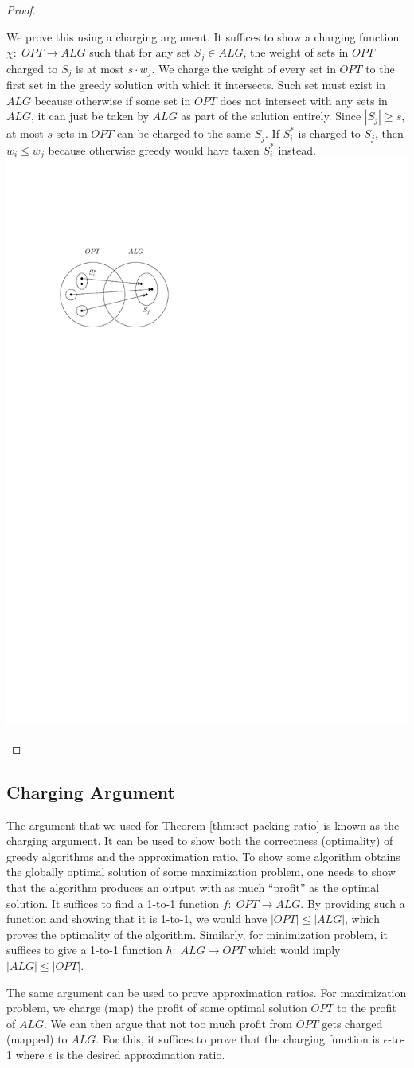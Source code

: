 \begin{proof}
    \begin{vwcol}[widths={0.7,0.3},sep=.8cm, justify=flush,rule=0pt,indent=1em]
        We prove this using a charging argument. It suffices to show a charging function $\chi:\; OPT \to ALG$ such that for any set $S_j \in ALG$, the weight of sets in $OPT$ charged to $S_j$ is at most $s \cdot w_j$. We charge the weight of every set in $OPT$ to the first set in the greedy solution with which it intersects. Such set must exist in $ALG$ because otherwise if some set in $OPT$ does not intersect with any sets in $ALG$, it can just be taken by $ALG$ as part of the solution entirely. Since $|S_j| \geq s$, at most $s$ sets in $OPT$ can be charged to the same $S_j$. If $S_i^*$ is charged to $S_j$, then $w_i \leq w_j$ because otherwise greedy would have taken $S_i^*$ instead.
        \includegraphics[width=0.25\linewidth]{set-cover-charging-argument.pdf}
    \end{vwcol}
\end{proof}

\subsection{Charging Argument}

The argument that we used for Theorem \ref{thm:set-packing-ratio} is known as the charging argument. It can be used to show both the correctness (optimality) of greedy algorithms and the approximation ratio. To show some algorithm obtains the globally optimal solution of some maximization problem, one needs to show that the algorithm produces an output with as much ``profit'' as the optimal solution. It suffices to find a 1-to-1 function $f:\; OPT \to ALG$. By providing such a function and showing that it is 1-to-1, we would have $|OPT| \leq |ALG|$, which proves the optimality of the algorithm. Similarly, for minimization problem, it suffices to give a 1-to-1 function $h:\; ALG \to OPT$ which would imply $|ALG| \leq |OPT|$.

The same argument can be used to prove approximation ratios. For maximization problem, we charge (map) the profit of some optimal solution $OPT$ to the profit of $ALG$. We can then argue that not too much profit from $OPT$ gets charged (mapped) to $ALG$. For this, it suffices to prove that the charging function is $\epsilon$-to-1 where $\epsilon$ is the desired approximation ratio.

